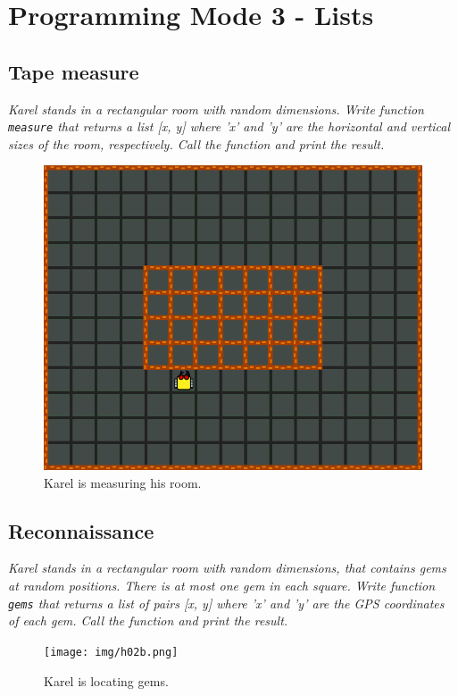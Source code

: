 
\section{Programming Mode 3 - Lists}


\subsection{Tape measure}

{\em Karel stands in a rectangular room with random dimensions. Write function {\tt measure}  
that returns a list [x, y] where 'x' and 'y' are the horizontal and vertical sizes of the room,
respectively. Call the function and print the result.}

\begin{figure}[!ht]
\begin{center}
\includegraphics[height=0.4\textwidth]{img/h02.png}
\end{center}
\vspace{-4mm}
\caption{Karel is measuring his room.}
\label{fig:h02}
\end{figure}

\newpage

\subsection{Reconnaissance}

{\em Karel stands in a rectangular room with random dimensions, that contains gems at random positions. There is at most one gem in each square. Write function {\tt gems}  that returns a list of pairs [x, y] where 'x' and 'y' are the GPS coordinates of each gem. Call the function and print the result.}


\begin{figure}[!ht]
\begin{center}
\texttt{[image: img/h02b.png]}
\end{center}
\vspace{-4mm}
\caption{Karel is locating gems.}
\label{fig:h02b}
\end{figure}


